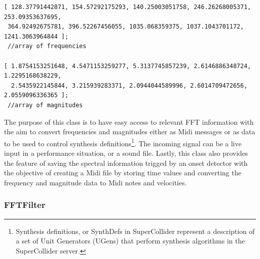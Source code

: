 \begin{verbatim}
[ 128.37791442871, 154.57292175293, 140.25003051758, 246.26268005371, 253.09353637695,
 364.92492675781, 396.52267456055, 1035.068359375, 1037.1043701172, 1241.3063964844 ]; 
 //array of frequencies

[ 1.8754153251648, 4.5471153259277, 5.3137745857239, 2.6146886348724, 1.2295168638229,
  2.5435922145844, 3.215939283371, 2.0944044589996, 2.6014709472656, 2.0559096336365 ]; 
 //array of magnitudes
\end{verbatim}
The purpose of this class is to have easy access to relevant FFT information with the aim to convert frequencies and magnitudes either as Midi messages or as data to be used to control synthesis definitions\footnote{Synthesis definitions, or SynthDefs in SuperCollider represent a description of a set of Unit Generators (UGens) that perform synthesis algorithms in the SuperCollider server.}. The incoming signal can be a live input in a performance situation, or a sound file. Lastly, this class also provides the feature of saving the spectral information trigged by an onset detector with the objective of  creating a Midi file by storing time values and converting the frequency and magnitude data to Midi notes and velocities.

\subsubsection{FFTFilter}
\hypertarget{fftfilter}{}

